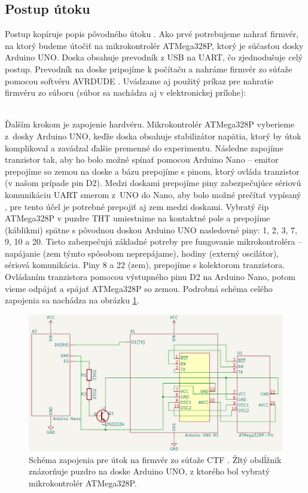 \subsection{Postup útoku}
Postup kopíruje popis pôvodného útoku \cite{vccOnTheCheap}. Ako prvé potrebujeme nahrať firmvér, na ktorý budeme útočiť na mikrokontrolér ATMega328P, ktorý je súčasťou dosky Arduino UNO. Doska obsahuje prevodník z USB na UART, čo zjednodušuje celý postup. Prevodník na doske pripojíme k počítaču a nahráme firmvér zo súťaže pomocou softvéru AVRDUDE \cite{avrdude}. Uvádzame aj použitý príkaz pre nahratie firmvéru zo súboru  \cite{vccOnTheCheap} (súbor sa nachádza aj v elektronickej prílohe):\\
\footnotesize {}\\
\normalsize

Ďalším krokom je zapojenie hardvéru. Mikrokontrolér ATMega328P vyberieme z~dosky Arduino UNO, keďže doska obsahuje stabilizátor napätia, ktorý by útok komplikoval a zavádzal ďalšie premenné do experimentu. Následne zapojíme tranzistor tak, aby ho bolo možné spínať pomocou Arduino Nano -- emitor prepojíme so zemou na doske a bázu prepojíme s pinom, ktorý ovláda tranzistor (v našom prípade pin D2). Medzi doskami prepojíme piny zabezpečujúce sériovú komunikáciu UART smerom z~UNO do Nano, aby bolo možné prečítať vypísaný , pre tento účel je potrebné prepojiť aj zem medzi doskami. Vybratý čip ATMega328P v puzdre THT umiestnime na kontaktné pole a prepojíme (káblikmi) spätne s pôvodnou doskou Arduino UNO nasledovné piny: 1, 2, 3, 7, 9, 10 a 20. Tieto zabezpečujú základné potreby pre fungovanie mikrokontroléra -- napájanie (zem týmto spôsobom neprepájame), hodiny (externý oscilátor), sériová komunikácia. Piny 8 a 22 (zem), prepojíme s kolektorom tranzistora. Ovládaním tranzistora pomocou výstupného pinu D2 na Arduino Nano, potom vieme odpájať a spájať ATMega328P so zemou. Podrobná schéma celého zapojenia sa nachádza na obrázku \ref{obr:schemeCTF}.

\begin{figure}
    \centerline{\includegraphics[width=1\textwidth]{images/schemeCTF.png}}
    \caption[Schéma zapojenia pre útok na firmvér zo súťaže CTF]{Schéma zapojenia pre útok na firmvér zo súťaže CTF \cite{vccOnTheCheap}. Žltý obdĺžnik znázorňuje puzdro na doske Arduino UNO, z ktorého bol vybratý mikrokontrolér ATMega328P.}
    \label{obr:schemeCTF}
\end{figure}


